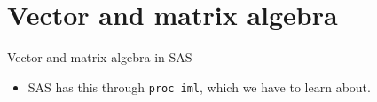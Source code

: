 \documentclass[unknownkeysallowed]{beamer}\usepackage[]{graphicx}\usepackage[]{color}
\begin{document}







\section{Vector and matrix algebra}

\frame{\sectionpage}

\begin{frame}[fragile]{Vector and matrix algebra in SAS}



  \begin{itemize}
  \item SAS has this through \texttt{proc iml}, which we have to learn
    about. 
  \end{itemize}
  
\end{frame}
\end{document}
